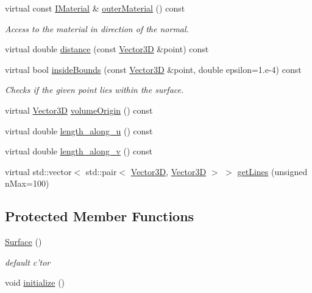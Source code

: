\begin{DoxyCompactItemize}
virtual const \hyperlink{class_d_d_surfaces_1_1_i_material}{IMaterial} \& \hyperlink{class_d_d4hep_1_1_d_d_rec_1_1_surface_a8844d989cfc893e8fc5e34d05cb2e410}{outerMaterial} () const 
\begin{DoxyCompactList}\small\item\em Access to the material in direction of the normal. \item\end{DoxyCompactList}\item 
virtual double \hyperlink{class_d_d4hep_1_1_d_d_rec_1_1_surface_a6c791cb45a57af72d629fc44ea208df4}{distance} (const \hyperlink{class_d_d_surfaces_1_1_vector3_d}{Vector3D} \&point) const 
\item 
virtual bool \hyperlink{class_d_d4hep_1_1_d_d_rec_1_1_surface_a2a86417b353cd25ee5bc96e8cc9dff2f}{insideBounds} (const \hyperlink{class_d_d_surfaces_1_1_vector3_d}{Vector3D} \&point, double epsilon=1.e-\/4) const 
\begin{DoxyCompactList}\small\item\em Checks if the given point lies within the surface. \item\end{DoxyCompactList}\item 
virtual \hyperlink{class_d_d_surfaces_1_1_vector3_d}{Vector3D} \hyperlink{class_d_d4hep_1_1_d_d_rec_1_1_surface_ab2b3a468ee678eb76912d659ddf404fc}{volumeOrigin} () const 
\item 
virtual double \hyperlink{class_d_d4hep_1_1_d_d_rec_1_1_surface_a2b027f9ee36a0e5a791b0cfa30199389}{length\_\-along\_\-u} () const 
\item 
virtual double \hyperlink{class_d_d4hep_1_1_d_d_rec_1_1_surface_a7c24c48062ae82692d31af6430b52ec6}{length\_\-along\_\-v} () const 
\item 
virtual std::vector$<$ std::pair$<$ \hyperlink{class_d_d_surfaces_1_1_vector3_d}{Vector3D}, \hyperlink{class_d_d_surfaces_1_1_vector3_d}{Vector3D} $>$ $>$ \hyperlink{class_d_d4hep_1_1_d_d_rec_1_1_surface_a54c81a4857e760fd9abb6773a9c19301}{getLines} (unsigned nMax=100)
\end{DoxyCompactItemize}
\subsection*{Protected Member Functions}
\begin{DoxyCompactItemize}
\item 
\hyperlink{class_d_d4hep_1_1_d_d_rec_1_1_surface_a9cbdd49c7183347839f20c80c114f0b6}{Surface} ()
\begin{DoxyCompactList}\small\item\em default c'tor \item\end{DoxyCompactList}\item 
void \hyperlink{class_d_d4hep_1_1_d_d_rec_1_1_surface_aeee7cc15facd37699acda7146f540fe1}{initialize} ()
\end{DoxyCompactItemize}
